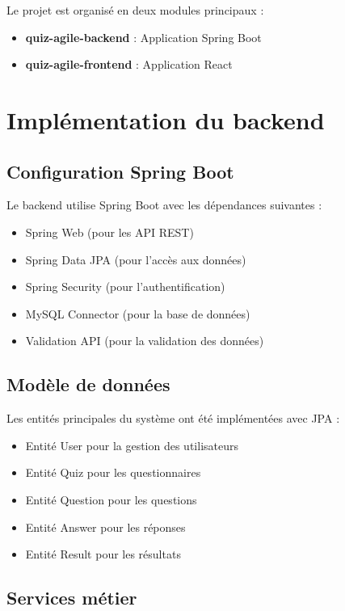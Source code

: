 \documentclass[12pt,a4paper]{report}
\begin{document}
Le projet est organisé en deux modules principaux :

\begin{itemize}
    \item \textbf{quiz-agile-backend} : Application Spring Boot
    \item \textbf{quiz-agile-frontend} : Application React
\end{itemize}

\section{Implémentation du backend}

\subsection{Configuration Spring Boot}

Le backend utilise Spring Boot avec les dépendances suivantes :

\begin{itemize}
    \item Spring Web (pour les API REST)
    \item Spring Data JPA (pour l'accès aux données)
    \item Spring Security (pour l'authentification)
    \item MySQL Connector (pour la base de données)
    \item Validation API (pour la validation des données)
\end{itemize}

\subsection{Modèle de données}

Les entités principales du système ont été implémentées avec JPA :

\begin{itemize}
    \item Entité User pour la gestion des utilisateurs
    \item Entité Quiz pour les questionnaires
    \item Entité Question pour les questions
    \item Entité Answer pour les réponses
    \item Entité Result pour les résultats
\end{itemize}

\subsection{Services métier}
\end{document}
